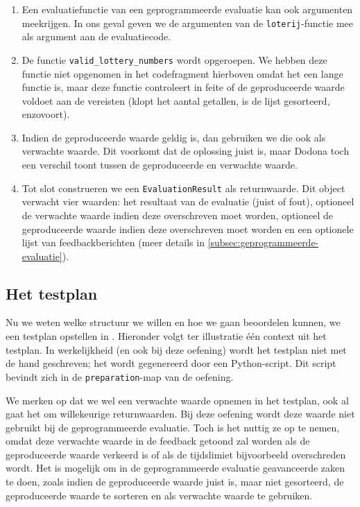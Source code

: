 \begin{enumerate}
    \item Een evaluatiefunctie van een geprogrammeerde evaluatie kan ook argumenten meekrijgen.
    In ons geval geven we de argumenten van de \texttt{loterij}-functie mee als argument aan de evaluatiecode.
    \item De functie \texttt{valid\_lottery\_numbers} wordt opgeroepen.
    We hebben deze functie niet opgenomen in het codefragment hierboven omdat het een lange functie is, maar deze functie controleert in feite of de geproduceerde waarde voldoet aan de vereisten (klopt het aantal getallen, is de lijst gesorteerd, enzovoort).
    \item Indien de geproduceerde waarde geldig is, dan gebruiken we die ook als verwachte waarde.
    Dit voorkomt dat de oplossing juist is, maar Dodona toch een verschil toont tussen de geproduceerde en verwachte waarde.
    \item Tot slot construeren we een \texttt{EvaluationResult} als returnwaarde.
    Dit object verwacht vier waarden: het resultaat van de evaluatie (juist of fout), optioneel de verwachte waarde indien deze overschreven moet worden, optioneel de geproduceerde waarde indien deze overschreven moet worden en een optionele lijst van feedbackberichten (meer details in \cref{subsec:geprogrammeerde-evaluatie}).
\end{enumerate}

\subsection{Het testplan}\label{subsec:oefening-lotto-testplan}

Nu we weten welke structuur we willen en hoe we gaan beoordelen kunnen, we een testplan opstellen in .
Hieronder volgt ter illustratie één context uit het testplan.
In werkelijkheid (en ook bij deze oefening) wordt het testplan niet met de hand geschreven;
het wordt gegenereerd door een Python-script.
Dit script bevindt zich in de \texttt{preparation}-map van de oefening.

We merken op dat we wel een verwachte waarde opnemen in het testplan, ook al gaat het om willekeurige returnwaarden.
Bij deze oefening wordt deze waarde niet gebruikt bij de geprogrammeerde evaluatie.
Toch is het nuttig ze op te nemen, omdat deze verwachte waarde in de feedback getoond zal worden als de geproduceerde waarde verkeerd is of als de tijdslimiet bijvoorbeeld overschreden wordt.
Het is mogelijk om in de geprogrammeerde evaluatie geavanceerde zaken te doen, zoals indien de geproduceerde waarde juist is, maar niet gesorteerd, de geproduceerde waarde te sorteren en als verwachte waarde te gebruiken.

